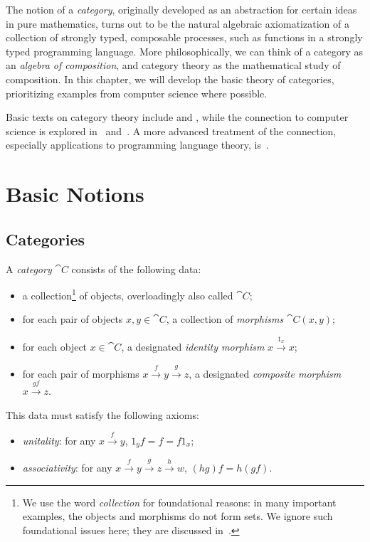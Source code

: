 
The notion of a \emph{category}, originally developed as an abstraction for
certain ideas in pure mathematics, turns out to be the natural algebraic
axiomatization of a collection of strongly typed, composable processes, such as
functions in a strongly typed programming language. More philosophically, we can
think of a category as an \emph{algebra of composition}, and category theory as
the mathematical study of composition. In this chapter, we will
develop the basic theory of categories, prioritizing examples from computer
science where possible.

Basic texts on category theory include \cite{maclane-1971} and
\cite{riehl-2017}, while the connection to computer science is explored
in~\cite{pierce-1991} and~\cite{barr-wells-1990}. A more advanced treatment of
the connection, especially applications to programming language theory,
is~\cite{jacobs-1999}.

\section{Basic Notions}

\subsection{Categories}


\begin{dfn}[category]\label{def:category}
	A \emph{category} $\cat{C}$ consists of the following data:
	\begin{itemize}
		\item a collection\footnote{We use the word \emph{collection} for foundational reasons: in
			      many important examples, the objects and morphisms do not form sets. We ignore
			      such foundational issues here; they are discussed in~\cite[subsection
				      1.6]{maclane-1971}.} of objects, overloadingly also called $\cat{C}$;
		\item for each pair of objects $x,y \in  \cat{C}$, a collection of \emph{morphisms} $\cat{C}(x, y)$;
		\item for each object $x \in \cat{C}$, a designated \emph{identity morphism} $x \xrightarrow{1_x}  x$;
		\item for each pair of morphisms $x \xrightarrow{f}  y \xrightarrow{g}  z$, a designated \emph{composite morphism} $x \xrightarrow{gf}  z$.
	\end{itemize}
	This data must satisfy the following axioms:
	\begin{itemize}
		\item \emph{unitality}: for any $x \xrightarrow{f}  y$, $1_yf = f = f1_x$;
		\item \emph{associativity}: for any $x \xrightarrow{f} 		y \xrightarrow{g} z \xrightarrow{h} w$, $(hg)f = h(gf)$.
	\end{itemize}
\end{dfn}

